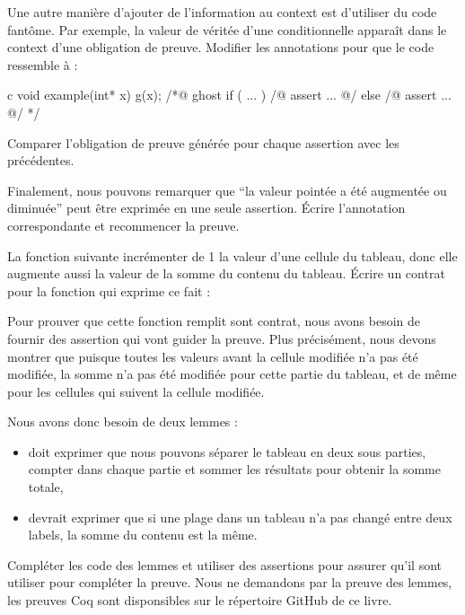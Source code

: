 Une autre manière d'ajouter de l'information au context est d'utiliser du
code fantôme. Par exemple, la valeur de véritée d'une conditionnelle apparaît
dans le context d'une obligation de preuve. Modifier les annotations pour que
le code ressemble à :


\begin{CodeBlock}{c}
void example(int* x){
  g(x);
  /*@ ghost
   if ( ... ){
    /@ assert ... @/
   } else {
    /@ assert ... @/
   }
  */
}
\end{CodeBlock}

Comparer l'obligation de preuve générée pour chaque assertion avec les précédentes.


Finalement, nous pouvons remarquer que ``la valeur pointée a été augmentée ou
diminuée'' peut être exprimée en une seule assertion. Écrire l'annotation
correspondante et recommencer la preuve.


\label{l4:proof-methodologies-triggering-lemmas-exercises-sum}


La fonction suivante incrémenter de 1 la valeur d'une cellule du tableau, donc
elle augmente aussi la valeur de la somme du contenu du tableau. Écrire un contrat
pour la fonction qui exprime ce fait :




Pour prouver que cette fonction remplit sont contrat, nous avons besoin de fournir
des assertion qui vont guider la preuve. Plus précisément, nous devons montrer que
puisque toutes les valeurs avant la cellule modifiée n'a pas été modifiée, la somme
n'a pas été modifiée pour cette partie du tableau, et de même pour les cellules qui
suivent la cellule modifiée.


Nous avons donc besoin de deux lemmes :

\begin{itemize}
    \item {} doit exprimer que nous pouvons séparer le
          tableau en deux sous parties, compter dans chaque partie et sommer les
          résultats pour obtenir la somme totale,
    \item {} devrait exprimer que si une plage dans un
          tableau n'a pas changé entre deux labels, la somme du contenu est la
          même.
\end{itemize}


Compléter les code des lemmes et utiliser des assertions pour assurer qu'il sont
utiliser pour compléter la preuve. Nous ne demandons par la preuve des lemmes, les
preuves Coq sont disponsibles sur le répertoire GitHub de ce livre.
